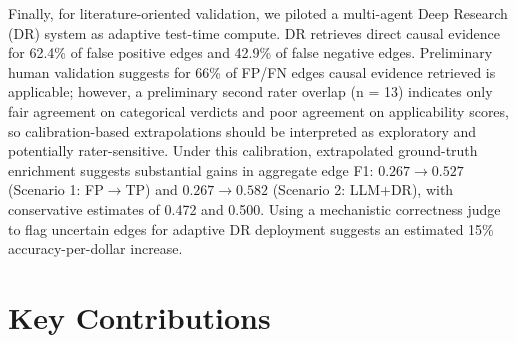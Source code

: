 Finally, for literature-oriented validation, we piloted a multi-agent Deep Research (DR) system as adaptive test-time compute. DR retrieves direct causal evidence for 62.4\% of false positive edges and 42.9\% of false negative edges. Preliminary human validation suggests for 66\% of FP/FN edges causal evidence retrieved is applicable; however, a preliminary second rater overlap (n = 13) indicates only fair agreement on categorical verdicts and poor agreement on applicability scores, so calibration-based extrapolations should be interpreted as exploratory and potentially rater-sensitive. Under this calibration, extrapolated ground-truth enrichment suggests substantial gains in aggregate edge F1: \(0.267 \to 0.527\) (Scenario 1: FP\(\to\)TP) and \(0.267 \to 0.582\) (Scenario 2: LLM+DR), with conservative estimates of 0.472 and 0.500. Using a mechanistic correctness judge to flag uncertain edges for adaptive DR deployment suggests an estimated 15\% accuracy-per-dollar increase.

\section{Key Contributions}
\label{sec:conclusion_contributions}

